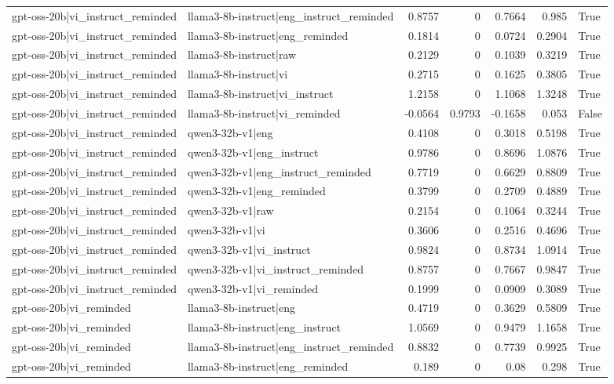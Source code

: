 \begin{table}
\begin{tabular}{l l r r r r l}
gpt-oss-20b|vi_instruct_reminded & llama3-8b-instruct|eng_instruct_reminded & 0.8757 & 0 & 0.7664 & 0.985 & True \\
gpt-oss-20b|vi_instruct_reminded & llama3-8b-instruct|eng_reminded & 0.1814 & 0 & 0.0724 & 0.2904 & True \\
gpt-oss-20b|vi_instruct_reminded & llama3-8b-instruct|raw & 0.2129 & 0 & 0.1039 & 0.3219 & True \\
gpt-oss-20b|vi_instruct_reminded & llama3-8b-instruct|vi & 0.2715 & 0 & 0.1625 & 0.3805 & True \\
gpt-oss-20b|vi_instruct_reminded & llama3-8b-instruct|vi_instruct & 1.2158 & 0 & 1.1068 & 1.3248 & True \\
gpt-oss-20b|vi_instruct_reminded & llama3-8b-instruct|vi_reminded & -0.0564 & 0.9793 & -0.1658 & 0.053 & False \\
gpt-oss-20b|vi_instruct_reminded & qwen3-32b-v1|eng & 0.4108 & 0 & 0.3018 & 0.5198 & True \\
gpt-oss-20b|vi_instruct_reminded & qwen3-32b-v1|eng_instruct & 0.9786 & 0 & 0.8696 & 1.0876 & True \\
gpt-oss-20b|vi_instruct_reminded & qwen3-32b-v1|eng_instruct_reminded & 0.7719 & 0 & 0.6629 & 0.8809 & True \\
gpt-oss-20b|vi_instruct_reminded & qwen3-32b-v1|eng_reminded & 0.3799 & 0 & 0.2709 & 0.4889 & True \\
gpt-oss-20b|vi_instruct_reminded & qwen3-32b-v1|raw & 0.2154 & 0 & 0.1064 & 0.3244 & True \\
gpt-oss-20b|vi_instruct_reminded & qwen3-32b-v1|vi & 0.3606 & 0 & 0.2516 & 0.4696 & True \\
gpt-oss-20b|vi_instruct_reminded & qwen3-32b-v1|vi_instruct & 0.9824 & 0 & 0.8734 & 1.0914 & True \\
gpt-oss-20b|vi_instruct_reminded & qwen3-32b-v1|vi_instruct_reminded & 0.8757 & 0 & 0.7667 & 0.9847 & True \\
gpt-oss-20b|vi_instruct_reminded & qwen3-32b-v1|vi_reminded & 0.1999 & 0 & 0.0909 & 0.3089 & True \\
gpt-oss-20b|vi_reminded & llama3-8b-instruct|eng & 0.4719 & 0 & 0.3629 & 0.5809 & True \\
gpt-oss-20b|vi_reminded & llama3-8b-instruct|eng_instruct & 1.0569 & 0 & 0.9479 & 1.1658 & True \\
gpt-oss-20b|vi_reminded & llama3-8b-instruct|eng_instruct_reminded & 0.8832 & 0 & 0.7739 & 0.9925 & True \\
gpt-oss-20b|vi_reminded & llama3-8b-instruct|eng_reminded & 0.189 & 0 & 0.08 & 0.298 & True \\

\end{tabular}
\end{table}
